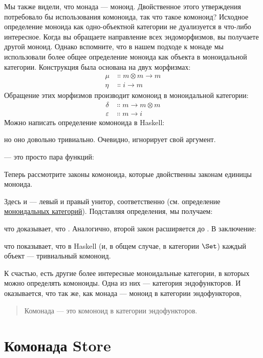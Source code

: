 Мы также видели, что монада --- моноид. Двойственное этого утверждения
потребовало бы использования комоноида, так что такое комоноид? Исходное
определение моноида как одно-объектной категории не дуализуется в
что-либо интересное. Когда вы обращаете направление всех
эндоморфизмов, вы получаете другой моноид. Однако вспомните, что в нашем
подходе к монаде мы использовали более общее определение моноида как
объекта в моноидальной категории. Конструкция была основана на двух
морфизмах:
\begin{align*}
  \mu  & \Colon m \otimes m \to m \\
  \eta & \Colon i \to m
\end{align*}
Обращение этих морфизмов производит комоноид в моноидальной
категории:
\begin{align*}
  \delta      & \Colon m \to m \otimes m \\
  \varepsilon & \Colon m \to i
\end{align*}
Можно написать определение комоноида в Haskell:

но оно довольно тривиально. Очевидно,  игнорирует свой
аргумент.

 --- это просто пара функций:

Теперь рассмотрите законы комоноида, которые двойственны законам единицы моноида.

Здесь  и  --- левый и правый унитор,
соответственно (см. определение
\hyperref[monads-categorically]{моноидальных
  категорий}). Подставляя определения, мы получаем:

что доказывает, что . Аналогично, второй закон расширяется
до . В заключение:

что показывает, что в Haskell (и, в общем случае, в категории
$\Set$) каждый объект --- тривиальный комоноид.

К счастью, есть другие более интересные моноидальные категории, в
которых можно определять комоноиды. Одна из них --- категория эндофункторов.
И оказывается, что так же, как монада --- моноид в категории
эндофункторов,

\begin{quote}
  Комонада --- это комоноид в категории эндофункторов.
\end{quote}

\section{Комонада Store}

